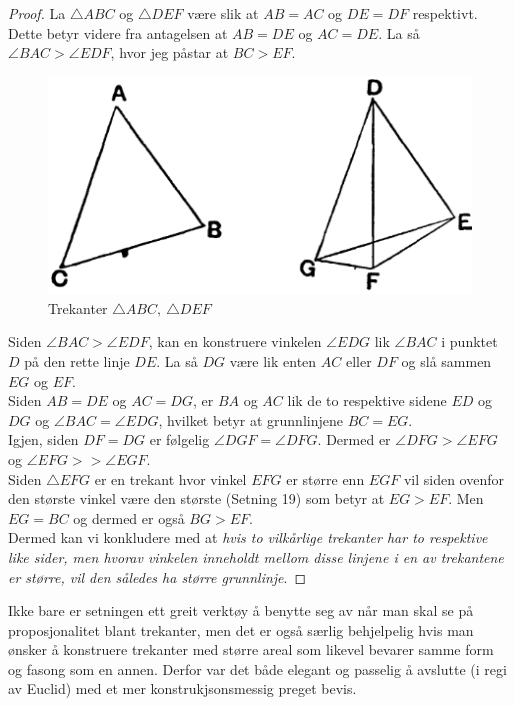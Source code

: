 \documentclass[12pt,
               a4paper,
               article,
               oneside,
               oldfontcommands,
               norsk]{memoir}
\begin{document}
\begin{proof}
La $\triangle ABC$ og $\triangle DEF$ være slik at $AB = AC$ og $DE = DF$ respektivt. Dette betyr videre fra antagelsen at $AB = DE$ og $AC = DE$. La så $\angle BAC > \angle EDF$, hvor jeg påstar at $BC > EF$.
\begin{figure}[H]
  \centering
  \includegraphics[scale=2.8]{setning_24.png}
  \caption{Trekanter $\triangle ABC, \ \triangle DEF$}
\end{figure}
Siden $\angle BAC > \angle EDF$, kan en konstruere vinkelen $\angle EDG$ lik $\angle BAC$ i punktet $D$ på den rette linje $DE$. La så $DG$ være lik enten $AC$ eller $DF$ og slå sammen $EG$ og $EF$. \vspace{2mm}\\ 
Siden $AB = DE$ og $AC = DG$, er $BA$ og $AC$ lik de to respektive sidene $ED$ og $DG$ og $\angle BAC = \angle EDG$, hvilket betyr at grunnlinjene $BC = EG$. \vspace{4mm}\\
Igjen, siden $DF = DG$ er følgelig $\angle DGF = \angle DFG$. Dermed er $\angle DFG > \angle EFG$ og $\angle EFG >> \angle EGF$. \vspace{4mm}\\ 
Siden $\triangle EFG$ er en trekant hvor vinkel $EFG$ er større enn $EGF$ vil siden ovenfor den største vinkel være den største (Setning 19) som betyr at $EG > EF$. Men $EG = BC$ og dermed er også $BG > EF$. \vspace{4mm}\\ 
Dermed kan vi konkludere med at \emph{hvis to vilkårlige trekanter har to respektive like sider, men hvorav vinkelen inneholdt mellom disse linjene i en av trekantene er større, vil den således ha større grunnlinje}.
\end{proof}\cite{Prop_24}\vspace{4mm}
Ikke bare er setningen ett greit verktøy å benytte seg av når man skal se på proposjonalitet blant trekanter, men det er også særlig behjelpelig hvis man ønsker å konstruere trekanter med større areal som likevel bevarer samme form og fasong som en annen. Derfor var det både elegant og passelig å avslutte (i regi av Euclid) med et mer konstrukjsonsmessig preget bevis.
\end{document}
